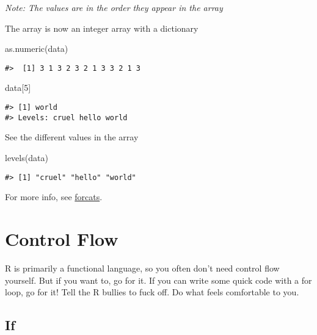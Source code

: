 \documentclass[
]{book}
\newenvironment{Shaded}{\begin{snugshade}}{\end{snugshade}}
\newcommand{\DecValTok}[1]{\textcolor[rgb]{0.00,0.00,0.81}{#1}}
\newcommand{\FunctionTok}[1]{\textcolor[rgb]{0.00,0.00,0.00}{#1}}
\newcommand{\NormalTok}[1]{#1}
\begin{document}
\emph{Note: The values are in the order they appear in the array}

The array is now an integer array with a dictionary

\begin{Shaded}
\begin{Highlighting}[]
\FunctionTok{as.numeric}\NormalTok{(data)}
\end{Highlighting}
\end{Shaded}

\begin{verbatim}
#>  [1] 3 1 3 2 3 2 1 3 3 2 1 3
\end{verbatim}

\begin{Shaded}
\begin{Highlighting}[]
\NormalTok{data[}\DecValTok{5}\NormalTok{]}
\end{Highlighting}
\end{Shaded}

\begin{verbatim}
#> [1] world
#> Levels: cruel hello world
\end{verbatim}

See the different values in the array

\begin{Shaded}
\begin{Highlighting}[]
\FunctionTok{levels}\NormalTok{(data)}
\end{Highlighting}
\end{Shaded}

\begin{verbatim}
#> [1] "cruel" "hello" "world"
\end{verbatim}

For more info, see \href{https://forcats.tidyverse.org/}{forcats}.

\hypertarget{control-flow}{%
\chapter{Control Flow}\label{control-flow}}

R is primarily a functional language, so you often don't need control flow yourself. But if you want to, go for it. If you can write some quick code with a for loop, go for it! Tell the R bullies to fuck off. Do what feels comfortable to you.

\hypertarget{if}{%
\section{If}\label{if}}
\end{document}
